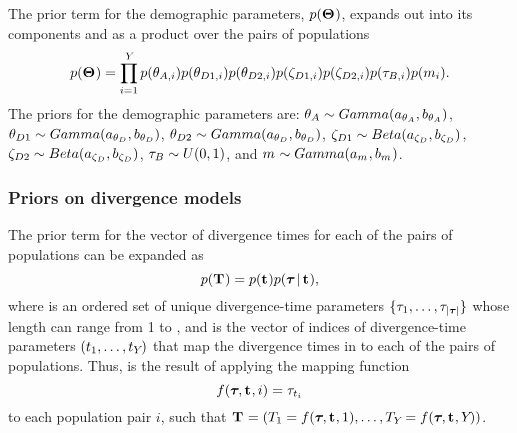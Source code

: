\begin{linenomath}
The prior term for the demographic parameters, $p(\mathbf{\Theta_{}})$,
expands out into its components and as a product over the \npairs{}
pairs of populations
\begin{equation}
    p(\demographicParamVector) =
    \prod_{i=1}^{\npairs{}}
    p(\ancestralTheta{i})
    p(\descendantTheta{1}{i})
    p(\descendantTheta{2}{i})
    p(\bottleScalar{1}{i})
    p(\bottleScalar{2}{i})
    p(\bottleTime{i})
    p(\migrationRate{i}).
    \label{eq:demographicPrior}
\end{equation}
The priors for the demographic parameters are:
$\ancestralTheta{} \sim Gamma(\gammaShape{\ancestralTheta{}},
\gammaScale{\ancestralTheta{}})$,
$\descendantTheta{1}{} \sim Gamma(\gammaShape{\descendantTheta{}{}},
\gammaScale{\descendantTheta{}{}})$,
$\descendantTheta{2}{} \sim Gamma(\gammaShape{\descendantTheta{}{}},
\gammaScale{\descendantTheta{}{}})$,
$\bottleScalar{1}{} \sim Beta(\betaA{\bottleScalar{}{}},
\betaB{\bottleScalar{}{}})$,
$\bottleScalar{2}{} \sim Beta(\betaA{\bottleScalar{}{}},
\betaB{\bottleScalar{}{}})$,
$\bottleTime{} \sim U(0, 1)$,
and
$m_{} \sim Gamma(a_{m_{}},
b_{m_{}})$.
\end{linenomath}

\subsubsection*{Priors on divergence models}
\begin{linenomath}
The prior term for the vector of divergence times for each of
the \npairs{} pairs of populations can be expanded as
\begin{equation}
    p(\mathbf{T_{}}) = p(\mathbf{t_{}})p(\boldsymbol{\tau_{}} \,|\, \mathbf{t_{}}),
    \label{eq:divModelPrior}
\end{equation}
where \divTimeVector is an ordered set of unique divergence-time parameters
$\{\tau_{1}, \ldots, \tau_{\lvert \boldsymbol{\tau_{}} \rvert}\}$ whose length
\divTimeNum can range from 1 to \npairs{},
and \divTimeIndexVector is the vector of indices of divergence-time parameters 
$(t_{1}, \ldots, t_{Y_{}})$
that map the divergence times in \divTimeVector to each of the \npairs{}
pairs of populations.
Thus, \divTimeMapVector is the result of applying the mapping function
\begin{equation}
    f(\boldsymbol{\tau_{}}, \mathbf{t_{}}, i) = \tau_{t_{i}}
    \label{eq:divTimeMapFunction}
\end{equation}
to each population pair $i$, such that
$\mathbf{T_{}} = (T_{1} = f(\boldsymbol{\tau_{}}, \mathbf{t_{}},
1), \ldots, T_{Y_{}} = f(\boldsymbol{\tau_{}}, \mathbf{t_{}},
Y_{}))$.
\end{linenomath}

